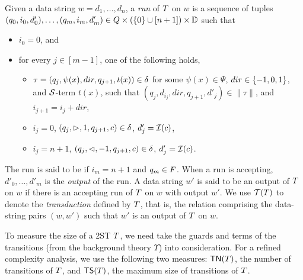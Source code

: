Given a data string $w = d_1, \dots, d_n$, a \emph{run} of $T$ on $w$
is a sequence of tuples $(q_0, i_0, d'_0), \ldots, (q_m, i_m, d'_m) \in Q \times (\{0\} \cup [n+1]) \times \mathbb{D}$ 
such that
\begin{itemize}
    \item $i_0 = 0$, and
    \item for every $j \in [m-1]$, one of the following holds,
    \begin{itemize}
  	\item  $\tau=(q_j, \psi(x), dir, q_{j+1}, t(x)) \in \delta$ for some $\psi(x) \in \Psi$, $dir \in \{-1, 0, 1\}$, and $\mathcal{S}$-term $t(x)$, such that $(q_j, d_{i_j}, dir, q_{j+1}, d'_j) \in \|\tau\|$, and $i_{j+1} = i_j + dir$,
	\item $i_j = 0$, $(q_j, \vartriangleright, 1, q_{j+1}, c) \in \delta$, $d'_j = \mathcal{I}(c)$,
	\item $i_j = n+1$, $(q_j, \vartriangleleft, -1, q_{j+1}, c) \in \delta$, $d'_j = \mathcal{I}(c)$.
  \end{itemize}
\end{itemize}
The run is said to be  if $i_m = n+1$ and $q_m \in F$. When a run is accepting, $d'_0, \ldots, d'_m$ is the \emph{output} of the run.
A data string $w'$ is said to be an output of $T$ on $w$ if there is an accepting run of
$T$ on $w$ with output $w'$. We use $\mathcal{T}(T)$ to denote the \emph{transduction} defined by $T$, that is, the relation comprising the data-string pairs $(w, w')$ such that $w'$ is an output of $T$ on $w$.

To measure the size of a 2ST $T$, we need take the guards and terms of the transitions (from the background theory $\Upsilon$) into  consideration. 
%
For a refined complexity analysis, we use the following two measures: %
$\mathsf{TN}(T)$, the number of transitions of $T$, and $\mathsf{TS}(T)$, the maximum size of transitions of $T$.


